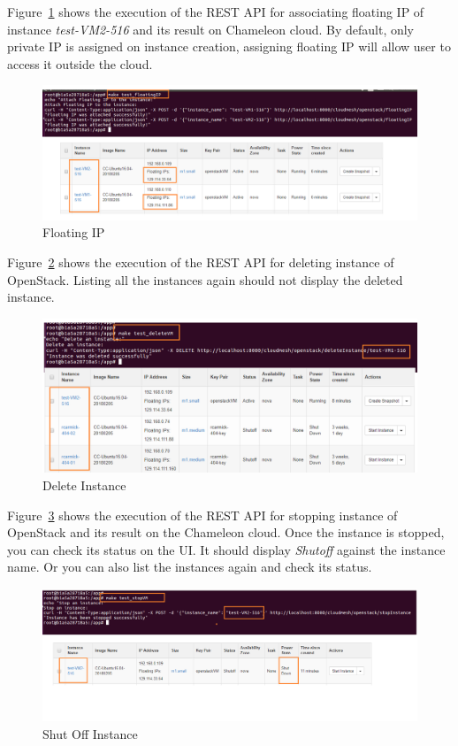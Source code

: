 Figure~\ref{fig:floatingIP} shows the execution of the REST API for associating
floating IP of instance \textit{test-VM2-516} and its result on Chameleon 
cloud. By default, only private IP is assigned on instance creation, assigning
floating IP will allow user to access it outside the cloud. 

\begin{figure}[!ht]
        \centering\includegraphics[width=\columnwidth]{images/floatingip.png}
        \caption{Floating IP}\label{fig:floatingIP}
\end{figure}

Figure~\ref{fig:deleteVM} shows the execution of the REST API for deleting
instance of OpenStack. Listing all the instances again should not display the
deleted instance.
\begin{figure}[!ht]
        \centering\includegraphics[width=\columnwidth]{images/deleteVM.png}
        \caption{Delete Instance}\label{fig:deleteVM}
\end{figure}

Figure~\ref{fig:stopVM} shows the execution of the REST API for stopping
instance of OpenStack and its result on the Chameleon cloud. Once the instance
is stopped, you can check its status on the UI. It should display 
\textit{Shutoff} against the instance name. Or you can also list the instances
again and check its status.

\begin{figure}[!ht]
        \centering\includegraphics[width=\columnwidth]{images/stopVM.png}
        \caption{Shut Off Instance}\label{fig:stopVM}
\end{figure}

